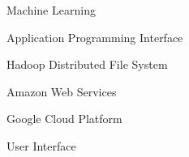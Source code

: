\begin{abbrv}
    \item[ML]           Machine Learning
    \item[API]          Application Programming Interface
    \item[HDFS]         Hadoop Distributed File System
    \item[AWS]          Amazon Web Services
    \item[GCP]          Google Cloud Platform
    \item[UI]           User Interface
\end{abbrv}

